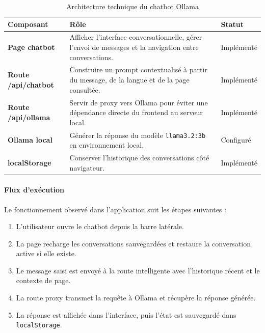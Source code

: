 \documentclass[12pt,a4paper]{report}
\newcommand{\tblhead}[1]{\cellcolor{darkblue}\color{white}\bfseries #1}
\newcommand{\tblleft}[1]{\bfseries\color{darkblue} #1}
\begin{document}
\renewcommand{\arraystretch}{1.25}
\begin{table}[H]
\centering
\begin{tabularx}{\textwidth}{|L{3.8cm}|Y|L{3cm}|}
\hline
\tblhead{Composant} & \tblhead{Rôle} & \tblhead{Statut} \\
\hline
\tblleft{Page chatbot} & Afficher l'interface conversationnelle, gérer l'envoi de messages et la navigation entre conversations. & Implémenté \\
\hline
\tblleft{Route /api/chatbot} & Construire un prompt contextualisé à partir du message, de la langue et de la page consultée. & Implémenté \\
\hline
\tblleft{Route /api/ollama} & Servir de proxy vers Ollama pour éviter une dépendance directe du frontend au serveur local. & Implémenté \\
\hline
\tblleft{Ollama local} & Générer la réponse du modèle \texttt{llama3.2:3b} en environnement local. & Configuré \\
\hline
\tblleft{localStorage} & Conserver l'historique des conversations côté navigateur. & Implémenté \\
\hline
\end{tabularx}
\caption{Architecture technique du chatbot Ollama}
\label{tab:architecture-chatbot-ollama}
\end{table}
\renewcommand{\arraystretch}{1}

\paragraph{Flux d'exécution}

Le fonctionnement observé dans l'application suit les étapes suivantes :

\begin{enumerate}
  \item L'utilisateur ouvre le chatbot depuis la barre latérale.
  \item La page recharge les conversations sauvegardées et restaure la conversation active si elle existe.
  \item Le message saisi est envoyé à la route intelligente avec l'historique récent et le contexte de page.
  \item La route proxy transmet la requête à Ollama et récupère la réponse générée.
  \item La réponse est affichée dans l'interface, puis l'état est sauvegardé dans \texttt{localStorage}.
\end{enumerate}
\end{document}
